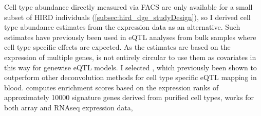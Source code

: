Cell type abundance directly measured via \gls{FACS} are only available for a small subset of \gls{HIRD} individuals (\autoref{subsec:hird_dge_studyDesign}), so I derived cell type abundance estimates from the expression data as an alternative.
Such estimates have previously been used in \gls{eQTL} analyses from bulk samples where cell type specific effects are expected\autocite{westra2015CellSpecificEQTL,davenport2018DiscoveringVivoCytokineeQTL,kim-hellmuth2019CellTypeSpecific}.
As the estimates are based on the expression of multiple genes, is not entirely circular to use them as covariates in this way for genewise \gls{eQTL} models.
%
%
%
I selected \autocite{aran2017XCellDigitallyPortraying}, which previously been shown to outperform other deconvolution methods for cell type specific \gls{eQTL} mapping in blood\autocite{kim-hellmuth2019CellTypeSpecific}.
 computes enrichment scores based on the expression ranks of approximately 10000 signature genes derived from purified cell types,
works for both array and \gls{RNAseq} expression data,
